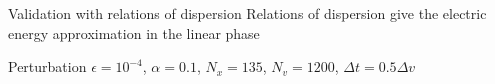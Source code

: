 \documentclass{beamer}
\begin{document}
\begin{frame}{Validation with relations of dispersion}
  Relations of dispersion give the electric energy approximation in the linear phase

  Perturbation $\epsilon=10^{-4}$, $\alpha=0.1$, $N_x = 135$, $N_v = 1200$, $\Delta t = 0.5\Delta v$
\end{frame}
\end{document}
